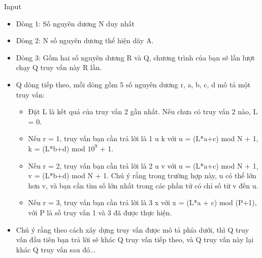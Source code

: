Input
\begin{itemize}
	\item Dòng 1: Số nguyên dương N duy nhất
	\item Dòng 2: N số nguyên dương thể hiện dãy A.
	\item Dòng 3: Gồm hai số nguyên dương R và Q, chương trình của bạn sẽ lần lượt chạy Q truy vấn này R lần.
	\item Q dòng tiếp theo, mỗi dòng gồm 5 số nguyên dương r, a, b, c, d mô tả một truy vấn:
\begin{itemize}
	\item Đặt L là kết quả của truy vấn 2 gần nhất. Nếu chưa có truy vấn 2 nào, L = 0.
	\item Nếu r = 1, truy vấn bạn cần trả lời là 1 u k với u = (L*a+c) mod N + 1, k = (L*b+d) mod $10^{9}$ + 1.
	\item Nếu r = 2, truy vấn bạn cần trả lời là 2 u v với u = (L*a+c) mod N + 1, v = (L*b+d) mod N + 1. Chú ý rằng trong trường hợp này, u có thể lớn hơn v, và bạn cần tìm số lớn nhất trong các phần tử có chỉ số từ v đến u.
	\item Nếu r = 3, truy vấn bạn cần trả lời là 3 x với x = (L*a + c) mod (P+1), với P là số truy vấn 1 và 3 đã được thực hiện.
\end{itemize}
	\item Chú ý rằng theo cách xây dựng truy vấn được mô tả phía dưới, thì Q truy vấn đầu tiên bạn trả lời sẽ khác Q truy vấn tiếp theo, và Q truy vấn này lại khác Q truy vấn sau đó...
\begin{itemize}
\end{itemize}
\end{itemize}